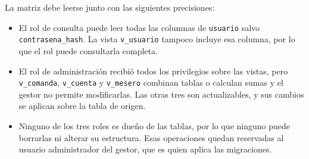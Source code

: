 La matriz debe leerse junto con las siguientes precisiones:

\begin{itemize}
    \item El rol de consulta puede leer todas las columnas de \texttt{usuario} salvo \texttt{contrasena\_hash}. La vista \texttt{v\_usuario} tampoco incluye esa columna, por lo que el rol puede consultarla completa.
    \item El rol de administración recibió todos los privilegios sobre las vistas, pero \texttt{v\_comanda}, \texttt{v\_cuenta} y \texttt{v\_mesero} combinan tablas o calculan sumas y el gestor no permite modificarlas. Las otras tres son actualizables, y sus cambios se aplican sobre la tabla de origen.
    \item Ninguno de los tres roles es dueño de las tablas, por lo que ninguno puede borrarlas ni alterar su estructura. Esas operaciones quedan reservadas al usuario administrador del gestor, que es quien aplica las migraciones.
\end{itemize}
